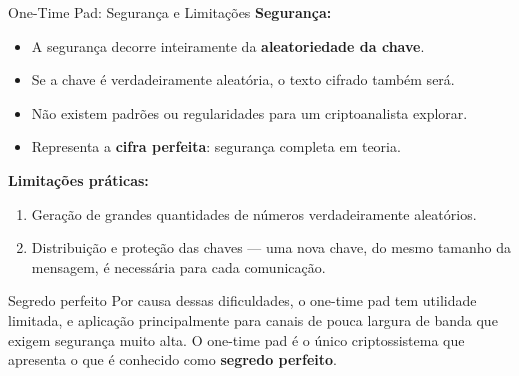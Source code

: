 \begin{frame}{One-Time Pad: Segurança e Limitações}
\textbf{Segurança:}  
\begin{itemize}
    \item A segurança decorre inteiramente da \textbf{aleatoriedade da chave}.  
    \item Se a chave é verdadeiramente aleatória, o texto cifrado também será.  
    \item Não existem padrões ou regularidades para um criptoanalista explorar.  
    \item Representa a \textbf{cifra perfeita}: segurança completa em teoria.  
\end{itemize}

\medskip
\textbf{Limitações práticas:}  
\begin{enumerate}
    \item Geração de grandes quantidades de números verdadeiramente aleatórios.  
    \item Distribuição e proteção das chaves — uma nova chave, do mesmo tamanho da mensagem, é necessária para cada comunicação.  
\end{enumerate}

\begin{block}{Segredo perfeito}
    Por causa dessas dificuldades, o one-time pad tem utilidade limitada, e aplicação principalmente para canais
de pouca largura de banda que exigem segurança muito alta.
O one-time pad é o único criptossistema que apresenta o que é conhecido como \textbf{segredo perfeito}.
\end{block}
\end{frame}



